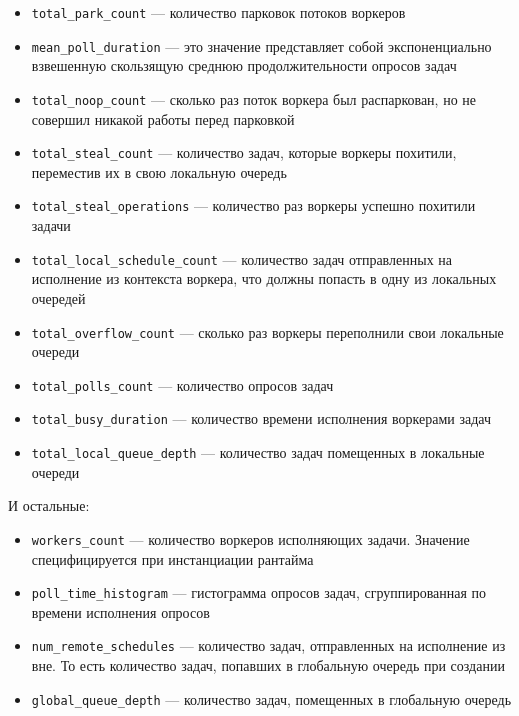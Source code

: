 \begin{itemize}
    \item \verb|total_park_count| --- количество парковок потоков воркеров
    \item \verb|mean_poll_duration| --- это значение представляет собой экспоненциально взвешенную скользящую среднюю продолжительности опросов задач
    \item \verb|total_noop_count| --- сколько раз поток воркера был распаркован, но не совершил никакой работы перед парковкой
    \item \verb|total_steal_count| --- количество задач, которые воркеры похитили, переместив их в свою локальную очередь
    \item \verb|total_steal_operations| --- количество раз воркеры успешно похитили задачи
    \item \verb|total_local_schedule_count| --- количество задач отправленных на исполнение из контекста воркера, что должны попасть в одну из локальных очередей
    \item \verb|total_overflow_count| --- сколько раз воркеры переполнили свои локальные очереди
    \item \verb|total_polls_count| --- количество опросов задач
    \item \verb|total_busy_duration| --- количество времени исполнения воркерами задач
    \item \verb|total_local_queue_depth| --- количество задач помещенных в локальные очереди
\end{itemize}

И остальные:

\begin{itemize}
    \item \verb|workers_count| --- количество воркеров исполняющих задачи. Значение специфицируется при инстанциации рантайма

    \item \verb|poll_time_histogram| --- гистограмма опросов задач, сгруппированная по времени исполнения опросов

    \item \verb|num_remote_schedules| --- количество задач, отправленных на исполнение из вне. То есть количество задач, попавших в глобальную очередь при создании

    \item \verb|global_queue_depth| --- количество задач, помещенных в глобальную очередь
\end{itemize}

